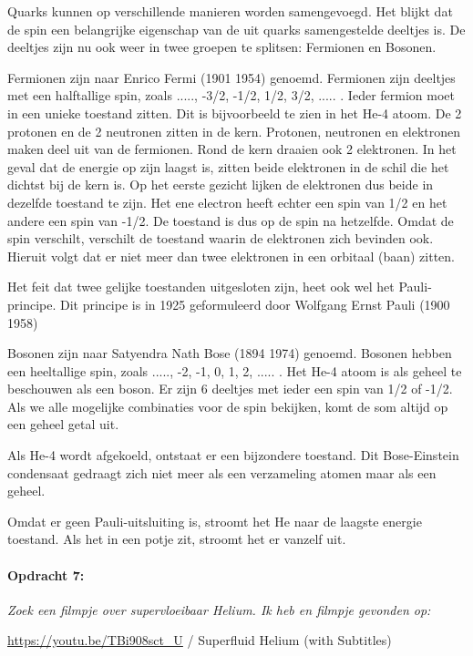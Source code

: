 Quarks kunnen op verschillende manieren worden samengevoegd. Het blijkt
dat de spin een belangrijke eigenschap van de uit quarks samengestelde
deeltjes is. De deeltjes zijn nu ook weer in twee groepen te splitsen:
Fermionen en Bosonen.

Fermionen zijn naar Enrico Fermi (1901 \textendash{} 1954) genoemd.
Fermionen zijn deeltjes met een halftallige spin, zoals ....., -3/2,
-1/2, 1/2, 3/2, ..... . Ieder fermion moet in een unieke toestand
zitten. Dit is bijvoorbeeld te zien in het He-4 atoom. De 2 protonen
en de 2 neutronen zitten in de kern. Protonen, neutronen en elektronen
maken deel uit van de fermionen. Rond de kern draaien ook 2 elektronen.
In het geval dat de energie op zijn laagst is, zitten beide elektronen
in de schil die het dichtst bij de kern is. Op het eerste gezicht
lijken de elektronen dus beide in dezelfde toestand te zijn. Het ene
electron heeft echter een spin van 1/2 en het andere een spin van
-1/2. De toestand is dus op de spin na hetzelfde. Omdat de spin verschilt,
verschilt de toestand waarin de elektronen zich bevinden ook. Hieruit
volgt dat er niet meer dan twee elektronen in een orbitaal (baan)
zitten.

Het feit dat twee gelijke toestanden uitgesloten zijn, heet ook wel
het Pauli-principe. Dit principe is in 1925 geformuleerd door Wolfgang
Ernst Pauli (1900 \textendash{} 1958)

Bosonen zijn naar Satyendra Nath Bose (1894 \textendash{} 1974) genoemd.
Bosonen hebben een heeltallige spin, zoals ....., -2, -1, 0, 1, 2,
..... . Het He-4 atoom is als geheel te beschouwen als een boson.
Er zijn 6 deeltjes met ieder een spin van 1/2 of -1/2. Als we alle
mogelijke combinaties voor de spin bekijken, komt de som altijd op
een geheel getal uit. 

Als He-4 wordt afgekoeld, ontstaat er een bijzondere toestand. Dit
Bose-Einstein condensaat gedraagt zich niet meer als een verzameling
atomen maar als een geheel.

Omdat er geen Pauli-uitsluiting is, stroomt het He naar de laagste
energie toestand. Als het in een potje zit, stroomt het er vanzelf
uit.


\paragraph*{Opdracht 7:}

\emph{Zoek een filmpje over supervloeibaar Helium. Ik heb en filmpje
gevonden op:}

\url{https://youtu.be/TBi908sct_U} / Superfluid Helium (with Subtitles)


